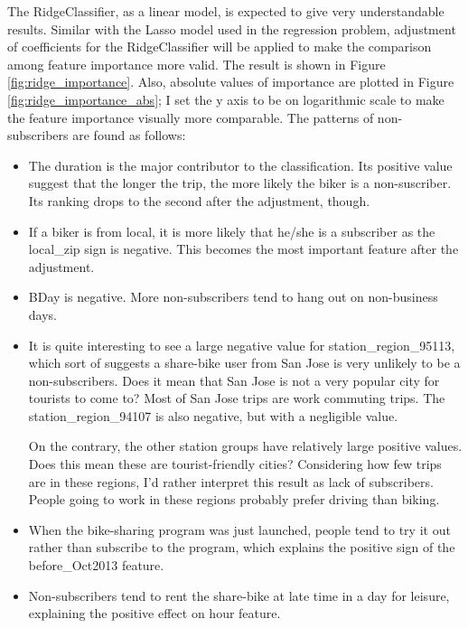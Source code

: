 \documentclass[a4paper]{article}
\begin{document}
			The RidgeClassifier, as a linear model, is expected to give very understandable results. Similar with the Lasso model used in the regression problem, adjustment of coefficients for the RidgeClassifier will be applied to make the comparison among feature importance more valid. The result is shown in Figure \ref{fig:ridge_importance}. Also, absolute values of importance are plotted in Figure \ref{fig:ridge_importance_abs}; I set the y axis to be on logarithmic scale to make the feature importance visually more comparable. The patterns of non-subscribers are found as follows:
			
			\begin{itemize}
				\item The duration is the major contributor to the classification. Its positive value suggest that the longer the trip, the more likely the biker is a non-suscriber. Its ranking drops to the second after the adjustment, though.
				
				\item If a biker is from local, it is more likely that he/she is a subscriber as the local\_zip sign is negative. This becomes the most important feature after the adjustment.
				
				\item BDay is negative. More non-subscribers tend to hang out on non-business days.
				
				\item It is quite interesting to see a large negative value for station\_region\_95113, which sort of suggests a share-bike user from San Jose is very unlikely to be a non-subscribers. Does it mean that San Jose is not a very popular city for tourists to come to? Most of San Jose trips are work commuting trips. The station\_region\_94107 is also negative, but with a negligible value. 
				
				On the contrary, the other station groups have relatively large positive values. Does this mean these are tourist-friendly cities? Considering how few trips are in these regions, I'd rather interpret this result as lack of subscribers. People going to work in these regions probably prefer driving than biking.
				
				\item When the bike-sharing program was just launched, people tend to try it out rather than subscribe to the program, which explains the positive sign of the before\_Oct2013 feature.
				
				\item Non-subscribers tend to rent the share-bike at late time in a day for leisure, explaining the positive effect on hour feature.
				

\end{itemize}
\end{document}
